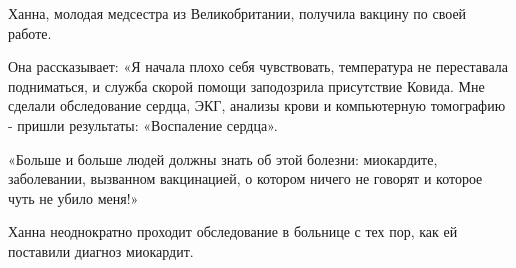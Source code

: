 Ханна, молодая медсестра из Великобритании, получила вакцину по своей работе.

Она рассказывает: «Я начала плохо себя чувствовать, температура не переставала
подниматься, и служба скорой помощи заподозрила присутствие Ковида. Мне сделали
обследование сердца, ЭКГ, анализы крови и компьютерную томографию - пришли
результаты: «Воспаление сердца».

«Больше и больше людей должны знать об этой болезни: миокардите, заболевании,
вызванном вакцинацией, о котором ничего не говорят и которое чуть не убило
меня!»

Ханна неоднократно проходит обследование в больнице с тех пор, как ей поставили
диагноз миокардит.
